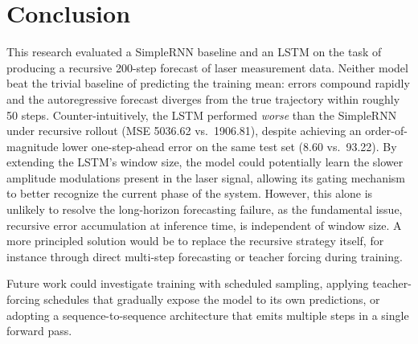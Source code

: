 \documentclass[conference]{IEEEtran}
\begin{document}
\section{Conclusion}
\label{Conclusion}
This research evaluated a SimpleRNN baseline and an LSTM on the task of producing a recursive 200-step forecast of laser measurement data. Neither model beat the trivial baseline of predicting the training mean: errors compound rapidly and the autoregressive forecast diverges from the true trajectory within roughly 50 steps. Counter-intuitively, the LSTM performed \emph{worse} than the SimpleRNN under recursive rollout (MSE 5036.62 vs.\ 1906.81), despite achieving an order-of-magnitude lower one-step-ahead error on the same test set (8.60 vs.\ 93.22). 
By extending the LSTM's window size, the model could potentially learn the slower amplitude modulations present in the laser signal, allowing its gating mechanism to better recognize the current phase of the system. However, this alone is unlikely to resolve the long-horizon forecasting failure, as the fundamental issue, recursive error accumulation at inference time,  is independent of window size. A more principled solution would be to replace the recursive strategy itself, for instance through direct multi-step forecasting or teacher forcing during training.


Future work could investigate training with scheduled sampling, applying teacher-forcing schedules that gradually expose the model to its own predictions, or adopting a sequence-to-sequence architecture that emits multiple steps in a single forward pass.


\end{document}
